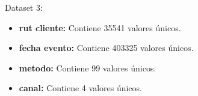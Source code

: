 Dataset 3:

\begin{itemize}
    \item \textbf{rut cliente:} Contiene 35541 valores únicos.
    \item \textbf{fecha evento:} Contiene 403325 valores únicos.
    \item \textbf{metodo:} Contiene 99 valores únicos.
    \item \textbf{canal:} Contiene 4 valores únicos.
\end{itemize}





